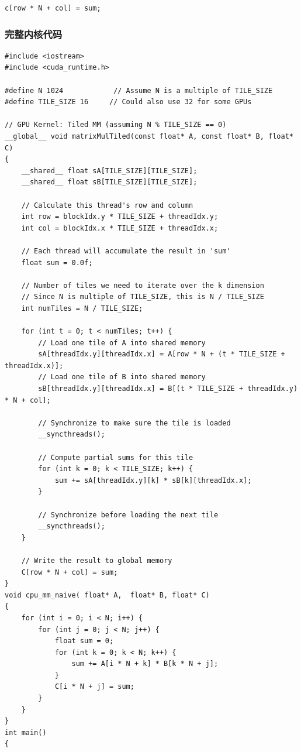 \begin{lstlisting}
c[row * N + col] = sum;
\end{lstlisting}

\subsubsection{完整内核代码}

\begin{lstlisting}
#include <iostream>
#include <cuda_runtime.h>

#define N 1024            // Assume N is a multiple of TILE_SIZE
#define TILE_SIZE 16     // Could also use 32 for some GPUs

// GPU Kernel: Tiled MM (assuming N % TILE_SIZE == 0)
__global__ void matrixMulTiled(const float* A, const float* B, float* C)
{
    __shared__ float sA[TILE_SIZE][TILE_SIZE];
    __shared__ float sB[TILE_SIZE][TILE_SIZE];

    // Calculate this thread's row and column
    int row = blockIdx.y * TILE_SIZE + threadIdx.y;
    int col = blockIdx.x * TILE_SIZE + threadIdx.x;

    // Each thread will accumulate the result in 'sum'
    float sum = 0.0f;

    // Number of tiles we need to iterate over the k dimension
    // Since N is multiple of TILE_SIZE, this is N / TILE_SIZE
    int numTiles = N / TILE_SIZE;

    for (int t = 0; t < numTiles; t++) {
        // Load one tile of A into shared memory
        sA[threadIdx.y][threadIdx.x] = A[row * N + (t * TILE_SIZE + threadIdx.x)];
        // Load one tile of B into shared memory
        sB[threadIdx.y][threadIdx.x] = B[(t * TILE_SIZE + threadIdx.y) * N + col];

        // Synchronize to make sure the tile is loaded
        __syncthreads();

        // Compute partial sums for this tile
        for (int k = 0; k < TILE_SIZE; k++) {
            sum += sA[threadIdx.y][k] * sB[k][threadIdx.x];
        }

        // Synchronize before loading the next tile
        __syncthreads();
    }

    // Write the result to global memory
    C[row * N + col] = sum;
}
void cpu_mm_naive( float* A,  float* B, float* C)
{
    for (int i = 0; i < N; i++) {
        for (int j = 0; j < N; j++) {
            float sum = 0;
            for (int k = 0; k < N; k++) {
                sum += A[i * N + k] * B[k * N + j];
            }
            C[i * N + j] = sum;
        }
    }
}
int main()
{


\end{lstlisting}
